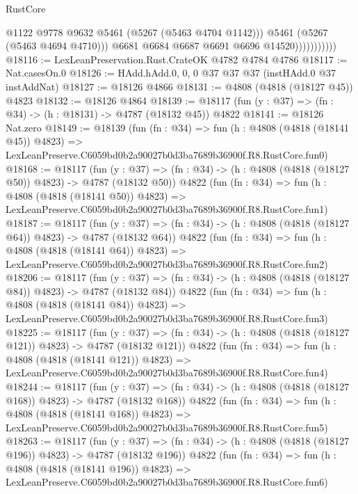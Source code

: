 \begin{lexlean}{RustCore}
\begin{coremodule}
                              @1122
                              @9778
                              @9632
                              @5461
                              (@5267 (@5463 @4704 @1142)))
                            @5461
                            (@5267 (@5463 @4694 @4710)))
                          @6681
                          @6684
                          @6687
                          @6691
                          @6696
                          @14520)))))))))))
@18116 := LexLeanPreservation.Rust.CrateOK @4782 @4784 @4786
@18117 := Nat.casesOn.{0}
@18126 := HAdd.hAdd.{0, 0, 0} @37 @37 @37 (instHAdd.{0} @37 instAddNat)
@18127 := @18126 @4866
@18131 := @4808 (@4818 (@18127 @45)) @4823
@18132 := @18126 @4864
@18139 := @18117 (fun (y : @37) => (fn : @34) -> (h : @18131) -> @4787 (@18132 @45)) @4822
@18141 := @18126 Nat.zero
@18149 := @18139
    (fun (fn : @34) =>
    fun (h : @4808 (@4818 (@18141 @45)) @4823) =>
    LexLeanPreserve.C6059bd0b2a90027b0d3ba7689b36900f.R8.RustCore.fun0)
@18168 := @18117
    (fun (y : @37) => (fn : @34) -> (h : @4808 (@4818 (@18127 @50)) @4823) -> @4787 (@18132 @50))
    @4822
    (fun (fn : @34) =>
    fun (h : @4808 (@4818 (@18141 @50)) @4823) =>
    LexLeanPreserve.C6059bd0b2a90027b0d3ba7689b36900f.R8.RustCore.fun1)
@18187 := @18117
    (fun (y : @37) => (fn : @34) -> (h : @4808 (@4818 (@18127 @64)) @4823) -> @4787 (@18132 @64))
    @4822
    (fun (fn : @34) =>
    fun (h : @4808 (@4818 (@18141 @64)) @4823) =>
    LexLeanPreserve.C6059bd0b2a90027b0d3ba7689b36900f.R8.RustCore.fun2)
@18206 := @18117
    (fun (y : @37) => (fn : @34) -> (h : @4808 (@4818 (@18127 @84)) @4823) -> @4787 (@18132 @84))
    @4822
    (fun (fn : @34) =>
    fun (h : @4808 (@4818 (@18141 @84)) @4823) =>
    LexLeanPreserve.C6059bd0b2a90027b0d3ba7689b36900f.R8.RustCore.fun3)
@18225 := @18117
    (fun (y : @37) => (fn : @34) -> (h : @4808 (@4818 (@18127 @121)) @4823) -> @4787 (@18132 @121))
    @4822
    (fun (fn : @34) =>
    fun (h : @4808 (@4818 (@18141 @121)) @4823) =>
    LexLeanPreserve.C6059bd0b2a90027b0d3ba7689b36900f.R8.RustCore.fun4)
@18244 := @18117
    (fun (y : @37) => (fn : @34) -> (h : @4808 (@4818 (@18127 @168)) @4823) -> @4787 (@18132 @168))
    @4822
    (fun (fn : @34) =>
    fun (h : @4808 (@4818 (@18141 @168)) @4823) =>
    LexLeanPreserve.C6059bd0b2a90027b0d3ba7689b36900f.R8.RustCore.fun5)
@18263 := @18117
    (fun (y : @37) => (fn : @34) -> (h : @4808 (@4818 (@18127 @196)) @4823) -> @4787 (@18132 @196))
    @4822
    (fun (fn : @34) =>
    fun (h : @4808 (@4818 (@18141 @196)) @4823) =>
    LexLeanPreserve.C6059bd0b2a90027b0d3ba7689b36900f.R8.RustCore.fun6)

\end{coremodule}
\end{lexlean}
